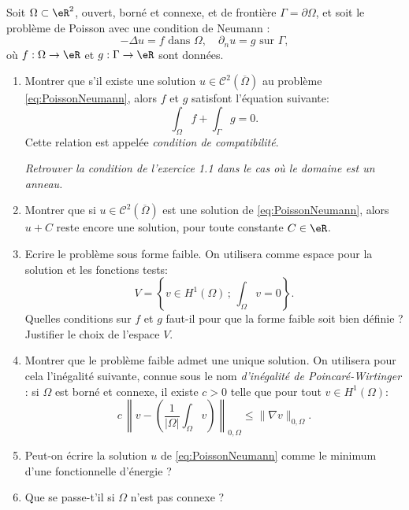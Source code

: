\begin{exercice}\label{exoChWeak_Neumann}

Soit $\Omega \subset \eR^2$, ouvert, borné et connexe, et de frontière $\Gamma = \partial \Omega$, et 
soit le problème de Poisson avec une condition de Neumann :
\begin{equation}\label{eq:PoissonNeumann}
- \Delta u = f \mbox{ dans } \Omega, \quad \partial_n u = g \mbox{ sur } \Gamma,
\end{equation}
où $f : \Omega \rightarrow \eR$ et $g : \Gamma \rightarrow \eR$ sont données.

\begin{enumerate}

\item Montrer que s'il existe une solution $u\in \mathcal{C}^2(\overline{\Omega})$ au problème \eqref{eq:PoissonNeumann}, alors $f$ et $g$ satisfont l'équation suivante:
\[
\int_\Omega f + \int_\Gamma g = 0.
\]
Cette relation est appelée \emph{condition de compatibilité}.

\emph{Retrouver la condition de l'exercice 1.1 dans le cas où le domaine est un anneau.}

\item Montrer que si $u\in \mathcal{C}^2(\overline{\Omega})$ est une solution de \eqref{eq:PoissonNeumann}, alors $u+C$ reste encore une solution, pour toute constante $C\in\eR$.

\item Ecrire le problème sous forme faible. On utilisera comme espace pour la solution et les fonctions tests:
\[
V = \left \{ v \in H^1(\Omega) \, ; \, \int_\Omega v = 0 \right \}.
\]
Quelles conditions sur $f$ et $g$ faut-il pour que la forme faible soit bien définie ? Justifier le choix de l'espace $V$.

\item Montrer que le problème faible admet une unique solution. On utilisera pour cela l'inégalité suivante, connue sous le nom \emph{d'inégalité de Poincaré-Wirtinger} : si $\Omega$ est borné et connexe, il existe $c>0$ telle que pour tout $v\in H^1(\Omega)$:
\[
c \, \left \| v - \left( \frac1{|\Omega|} \int_\Omega v \right ) \right \|_{0,\Omega} \leq \| \nabla v \|_{0,\Omega}.
\]

\item Peut-on écrire la solution $u$ de \eqref{eq:PoissonNeumann} comme le minimum d'une fonctionnelle d'énergie ?

\item Que se passe-t'il si $\Omega$ n'est pas connexe ?

\end{enumerate}

\end{exercice}

